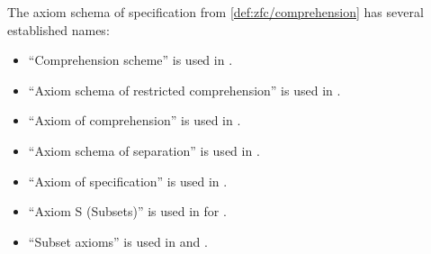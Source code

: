 \begin{remark}\label{rem:axiom_of_specification_names}
  The axiom schema of specification from \cref{def:zfc/comprehension} has several established names:
  \begin{itemize}
    \item \enquote{Comprehension scheme} is used in \cite[17]{Kunen2013SetTheory}.

    \item \enquote{Axiom schema of restricted comprehension} is used in \cite[244]{Mimram2020ProgramEqualsProof}.

    \item \enquote{Axiom of comprehension} is used in \cite[30]{Schechter1997AnalysisHandbook}.

    \item \enquote{Axiom schema of separation} is used in \cite[3]{Jech2006SetTheory}.

    \item \enquote{Axiom of specification} is used in \cite[3]{Halmos1960NaiveSetTheory}.

    \item \enquote{Axiom S (Subsets)} is used in \cite[243]{Mendelson2015Logic} for \hyperref[rem:set_theory_acronyms/nbg]{}.

    \item \enquote{Subset axioms} is used in \cite[21]{Enderton1977SetTheory} and \cite[239]{Shoenfield1967MathematicalLogic}.
  \end{itemize}
\end{remark}


